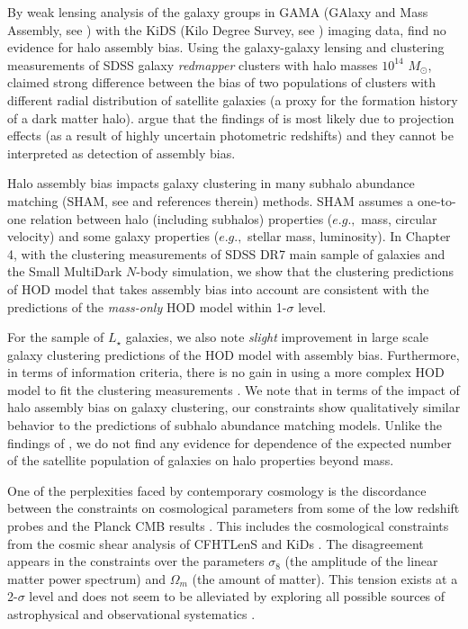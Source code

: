By weak lensing analysis of the galaxy groups in GAMA (GAlaxy and Mass Assembly, see \citealt{driver}) 
with the KiDS (Kilo Degree Survey, see \citealt{kuijken2015}) imaging data, \citet{dvornik2017} find no evidence for halo assembly bias.
Using the galaxy-galaxy lensing and clustering measurements of SDSS galaxy \emph{redmapper} clusters \citep{rykoff} with halo masses $10^{14}$ $M_{\odot}$, 
\citet{miyatake2016} claimed strong difference between the bias of two populations of clusters with different radial distribution of satellite galaxies 
(a proxy for the formation history of a dark matter halo). \citet{zuetal2016} argue that the findings of \citet{miyatake2016} is most likely due to projection effects (as a result of highly uncertain photometric redshifts) and they cannot be interpreted as detection of assembly bias. 

Halo assembly bias impacts galaxy clustering in many subhalo abundance matching (SHAM, see \citealt{hearin2014,lehman2015} and references therein) methods. SHAM assumes a one-to-one relation between halo (including subhalos) properties ($e.g.,$ mass, circular velocity) and some galaxy properties ($e.g.,$ stellar mass, luminosity). In Chapter 4, with the clustering measurements of SDSS DR7 main sample of galaxies \citep{abazajian2009} and the Small MultiDark $N$-body simulation, we show that the clustering predictions of \citet{decorated} HOD model that takes assembly bias into account are consistent with the predictions of the \emph{mass-only} HOD model within 1-$\sigma$ level. 

For the sample of $L_{\star}$ galaxies, we also note \emph{slight} improvement in large scale galaxy clustering predictions of the HOD model with assembly bias. 
Furthermore, in terms of information criteria, there is no gain in using a more complex HOD model to fit the clustering measurements \citep{decorated}.
We note that in terms of the impact of halo assembly bias on galaxy clustering, our constraints show qualitatively similar behavior to the predictions of subhalo abundance matching models. Unlike the findings of \citet{zentner2016}, we do not find any evidence for dependence of the expected number of the satellite population of galaxies on halo properties beyond mass.

One of the perplexities faced by contemporary cosmology is the discordance between the constraints on cosmological parameters from some of the low redshift probes and 
the Planck CMB results \citep{planckII}. This includes the cosmological constraints from the cosmic shear analysis of CFHTLenS \citep{heymans,kitching2016} and KiDs \citep{hildebrandt2017}. The disagreement appears in the constraints over the parameters $\sigma_{8}$ (the amplitude of the linear matter power spectrum) and $\Omega_{m}$ (the amount of matter). This tension exists at a 2-$\sigma$ level and does not seem to be alleviated by exploring all possible sources of astrophysical and observational systematics \citep{battye2014,boris2014,maccrann2015,grandis2016,raveri2016}. 

